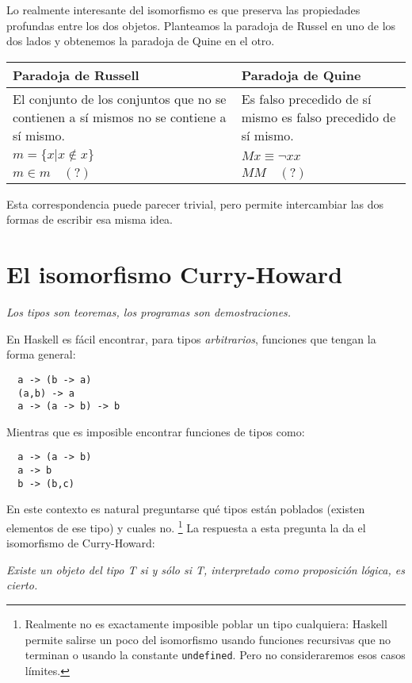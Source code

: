 \documentclass[paper=a4, fontsize=11pt, spanish]{scrartcl} %
\numberwithin{equation}{section} %
\numberwithin{figure}{section} %
\numberwithin{table}{section} %
\begin{document}
    Lo realmente interesante del isomorfismo es que preserva las propiedades profundas entre
    los dos objetos. Planteamos la paradoja de Russel en uno de los dos lados y obtenemos
    la paradoja de Quine en el otro.
    \begin{table}[htbp]
      \centering
      \begin{tabularx}{\textwidth}{X|X}
      \textbf{Paradoja de Russell} & \textbf{Paradoja de Quine} \\
      \hline
      El conjunto de los conjuntos que no se contienen a sí 
      mismos no se contiene a sí mismo. &
      Es falso precedido de sí mismo es falso precedido de sí mismo. \\
	\centerline{$m = \{x | x \notin x\}$} &
	\centerline{$M x \equiv \neg x x$} \\  
	\centerline{$m \in m \quad(?)$} &
	\centerline{$M M \quad(?)$} \\ 
      \end{tabularx}
    \end{table}
    Esta correspondencia puede parecer trivial, pero permite intercambiar las dos
    formas de escribir esa misma idea.
    
    
  \section{El isomorfismo Curry-Howard}
    \begin{center}
      \textit{ Los tipos son teoremas, los programas son demostraciones.}
    \end{center}
    
    En Haskell es fácil encontrar, para tipos \textit{arbitrarios}, funciones que tengan la forma
    general:
    \begin{lstlisting}
  a -> (b -> a)
  (a,b) -> a
  a -> (a -> b) -> b
    \end{lstlisting}
    Mientras que es imposible  encontrar funciones de tipos como:
    \begin{lstlisting}
  a -> (a -> b)
  a -> b
  b -> (b,c)
    \end{lstlisting}
    En este contexto es natural preguntarse qué tipos están poblados (existen elementos de
    ese tipo) y cuales no. \footnote{Realmente no es exactamente imposible poblar un tipo cualquiera: Haskell permite salirse un poco
    del isomorfismo usando funciones recursivas que no terminan o usando la constante \texttt{undefined}.
    Pero no consideraremos esos casos límites.} La respuesta a esta pregunta la da el isomorfismo de Curry-Howard:
    \begin{center}
     \textit{Existe un objeto del tipo T si y sólo si T, interpretado como proposición lógica,
      es cierto.}
    \end{center}
    
\end{document}
